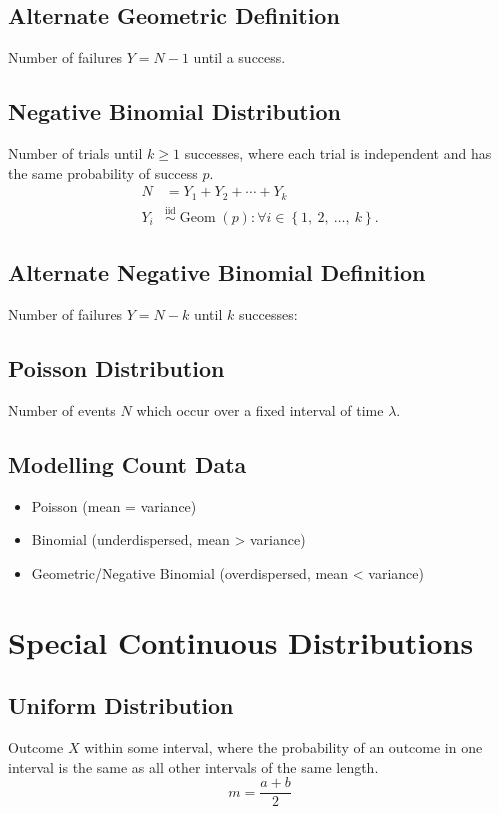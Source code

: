 \documentclass{article}
\begin{document}
\begin{multicols}{3}
    \subsection{Alternate Geometric Definition}
    Number of failures \(Y = N - 1\) until a success.
    \subsection{Negative Binomial Distribution}
    Number of trials until \(k \geq 1\) successes, where each trial is independent and has the same probability of success \(p\).
    \begin{align*}
        N   & = Y_1 + Y_2 + \cdots + Y_k                                                                                                \\
        Y_i & \overset{\mathrm{iid}}{\sim} \operatorname{Geom}{\left( p \right)} : \forall i \in \left\{ 1,\: 2,\: \dots,\: k \right\}.
    \end{align*}
    \subsection{Alternate Negative Binomial Definition}
    Number of failures \(Y = N - k\) until \(k\) successes:
    \subsection{Poisson Distribution}
    Number of events \(N\) which occur over a fixed interval of time \(\lambda\).
    \subsection{Modelling Count Data}
    \begin{itemize}
        \item Poisson (mean = variance)
        \item Binomial (underdispersed, mean > variance)
        \item Geometric/Negative Binomial (overdispersed, mean < variance)
    \end{itemize}
    \section{Special Continuous Distributions}
    \subsection{Uniform Distribution}
    Outcome \(X\) within some interval, where the probability of an outcome in one interval is the same as all other intervals of the same length.
    \begin{equation*}
        m = \frac{a + b}{2}
    \end{equation*}

\end{multicols}
\end{document}
